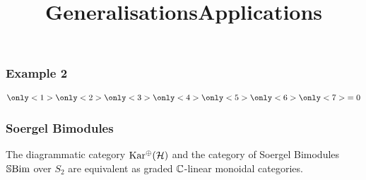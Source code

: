 \begin{frame}
    \frametitle{Example 2}

    \begin{align*}
        \only<1>{
            
        }
        \only<2>{
            
        }
        \only<3>{
            
        }
        \only<4>{
            
        }
        \only<5>{
            
        }
        \only<6>{
            
        }
        \only<7>{
             = 0
        }
    \end{align*}
\end{frame}


\begin{frame}
    \frametitle{Soergel Bimodules}

    \begin{theorem}
        The diagrammatic category $\operatorname{Kar^\oplus}(\mathcal{H})$ and the category of Soergel Bimodules $\operatorname{\mathbb{S}Bim}$ over $S_2$ are equivalent as graded $\mathbb{C}$-linear monoidal categories.
    \end{theorem}
\end{frame}



\title{Generalisations}\maketitle

\title{Applications}\maketitle


